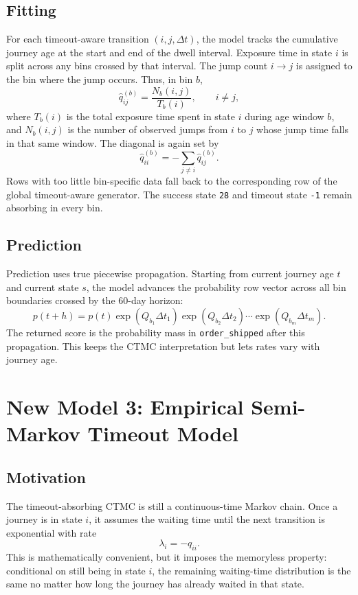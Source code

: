 \documentclass[11pt]{article}
\begin{document}
\subsection{Fitting}

For each timeout-aware transition $(i,j,\Delta t)$, the model tracks the
cumulative journey age at the start and end of the dwell interval. Exposure
time in state $i$ is split across any bins crossed by that interval. The jump
count $i\to j$ is assigned to the bin where the jump occurs. Thus, in bin $b$,
\[
    \hat q^{(b)}_{ij}
    =
    \frac{N_b(i,j)}{T_b(i)},
    \qquad i\neq j,
\]
where $T_b(i)$ is the total exposure time spent in state $i$ during age window
$b$, and $N_b(i,j)$ is the number of observed jumps from $i$ to $j$ whose jump
time falls in that same window. The diagonal is again set by
\[
    \hat q^{(b)}_{ii}=-\sum_{j\neq i}\hat q^{(b)}_{ij}.
\]
Rows with too little bin-specific data fall back to the corresponding row of
the global timeout-aware generator. The success state \texttt{28} and timeout
state \texttt{-1} remain absorbing in every bin.

\subsection{Prediction}

Prediction uses true piecewise propagation. Starting from current journey age
$t$ and current state $s$, the model advances the probability row vector across
all bin boundaries crossed by the 60-day horizon:
\[
    p(t+h)
    =
    p(t)
    \exp(Q_{b_1}\Delta t_1)
    \exp(Q_{b_2}\Delta t_2)
    \cdots
    \exp(Q_{b_m}\Delta t_m).
\]
The returned score is the probability mass in \texttt{order\_shipped} after
this propagation. This keeps the CTMC interpretation but lets rates vary with
journey age.

\section{New Model 3: Empirical Semi-Markov Timeout Model}

\subsection{Motivation}

The timeout-absorbing CTMC is still a continuous-time Markov chain. Once a
journey is in state $i$, it assumes the waiting time until the next transition
is exponential with rate
\[
    \lambda_i = -q_{ii}.
\]
This is mathematically convenient, but it imposes the memoryless property:
conditional on still being in state $i$, the remaining waiting-time
distribution is the same no matter how long the journey has already waited in
that state.
\end{document}
